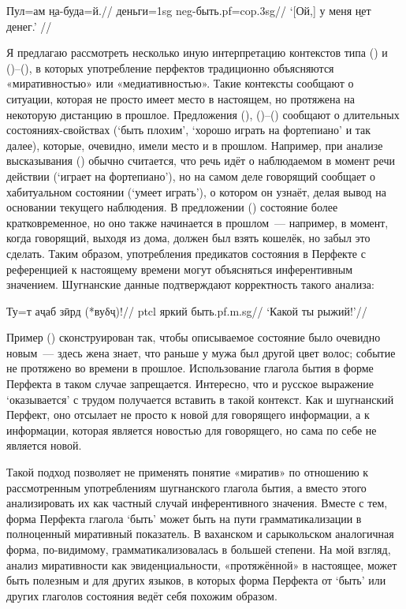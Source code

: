 {{{
\begingl
\gla Пул=ам \b{на-буда=й}.//
\glc деньги={\sc 1sg} {\sc neg}-быть.{\sc pf=cop.3sg}//
\glft ‘[Ой,] у меня \b{нет} денег.’ //
\endgl \xe

\pagebreak[4]

Я предлагаю рассмотреть несколько иную интерпретацию контекстов типа () и ()–(), в которых употребление перфектов традиционно объясняются «миративностью» или «медиативностью». Такие контексты сообщают о ситуации, которая не просто имеет место в настоящем, но протяжена на некоторую дистанцию в прошлое. Предложения (), ()–() сообщают о длительных состояниях-свойствах (‘быть плохим’, ‘хорошо играть на фортепиано’ и так далее), которые, очевидно, имели место и в прошлом. Например, при анализе высказывания () обычно считается, что речь идёт о наблюдаемом в момент речи действии (‘играет на фортепиано’), но на самом деле говорящий сообщает о хабитуальном состоянии (‘умеет играть’), о котором он узнаёт, делая вывод на основании текущего наблюдения. В предложении () состояние более кратковременное, но оно также начинается в прошлом~— например, в момент, когда говорящий, выходя из дома, должен был взять кошелёк, но забыл это сделать. Таким образом, употребления предикатов состояния в Перфекте с референцией к настоящему времени могут объясняться инферентивным значением. Шугнанские данные подтверждают корректность такого анализа:

\begingl
\gla Ту=т аҷаб зӣрд (*вуδҷ)!//
 {\sc ptcl} яркий быть.{\sc pf.m.sg}//
 ‘Какой ты рыжий!’//
\endgl \xe

Пример () сконструирован так, чтобы описываемое состояние было очевидно новым~— здесь жена знает, что раньше у мужа был другой цвет волос; событие не протяжено во времени в прошлое. Использование глагола бытия в форме Перфекта в таком случае запрещается. Интересно, что и русское выражение ‘оказывается’ с трудом получается вставить в такой контекст. Как и шугнанский Перфект, оно отсылает не просто к новой для говорящего информации, а к информации, которая является новостью для говорящего, но сама по себе не является новой.

Такой подход позволяет не применять понятие «миратив» по отношению к рассмотренным употреблениям шугнанского глагола бытия, а вместо этого анализировать их как частный случай инферентивного значения. Вместе с тем, форма Перфекта глагола ‘быть’ может быть на пути грамматикализации в полноценный миративный показатель. В ваханском и сарыкольском аналогичная форма, по-видимому, грамматикализовалась в большей степени. На мой взгляд, анализ миративности как эвиденциальности, «протяжённой» в настоящее, может быть полезным и для других языков, в которых форма Перфекта от ‘быть’ или других глаголов состояния ведёт себя похожим образом.

}}}
